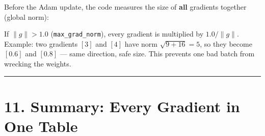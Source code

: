 \documentclass[11pt,a4paper,oneside]{report}
\begin{document}
Before the Adam update, the code measures the size of \textbf{all} gradients together (global norm):

\begin{center}\end{center}

If \(\|g\| > 1.0\) (\texttt{max\_\allowbreak{}grad\_\allowbreak{}norm}), every gradient is multiplied by \(1.0 / \|g\|\). Example: two gradients \([3]\) and \([4]\) have norm \(\sqrt{9 + 16} = 5\), so they become \([0.6]\) and \([0.8]\) --- same direction, safe size. This prevents one bad batch from wrecking the weights.

\begin{center}\rule{0.5\linewidth}{0.5pt}\end{center}

\section{11. Summary: Every Gradient in One Table}\label{11-summary-every-gradient-in-one-table}
\end{document}
